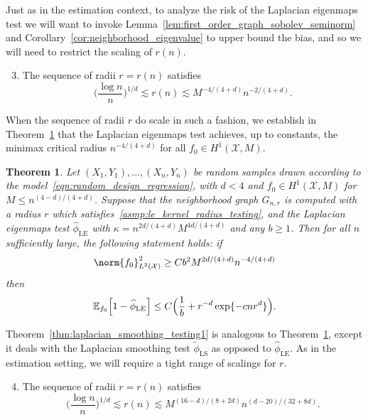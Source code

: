 \documentclass{article}
\newcommand{\1}{\mathbf{1}}
\newcommand{\Xset}{\mathcal{X}}
\newcommand{\Leb}{L}
\newcommand{\Ebb}{\mathbb{E}}
\newcommand{\wt}[1]{\widetilde{#1}}
\newcommand{\wh}[1]{\widehat{#1}}
\newcommand{\LE}{\mathrm{LE}}
\newcommand{\LS}{\mathrm{LS}}
\theoremstyle{alden}
\theoremstyle{aldenthm}
\newtheorem{theorem}{Theorem}
\theoremstyle{definition}
\theoremstyle{remark}
\begin{document}
Just as in the estimation context, to analyze the risk of the Laplacian eigenmaps test we will want to invoke Lemma~\ref{lem:first_order_graph_sobolev_seminorm} and Corollary~\ref{cor:neighborhood_eigenvalue} to upper bound the bias, and so we will need to restrict the scaling of $r(n)$.
\begin{enumerate}[label=(R\arabic*)]
	\setcounter{enumi}{2}
	\item 
	\label{asmp:le_kernel_radius_testing}
	The sequence of radii $r = r(n)$ satisfies
	\begin{equation*}
	\biggl(\frac{\log n}{n}\biggr)^{1/d} \lesssim r(n) \lesssim M^{-4/(4 + d)}n^{-2/(4 + d)}.
	\end{equation*}
\end{enumerate}
When the sequence of radii $r$ do scale in such a fashion, we establish in Theorem~\ref{thm:laplacian_eigenmaps_testing1} that the Laplacian eigenmaps test achieves, up to constants, the minimax critical radius $n^{-4/(4 + d)}$ for all $f_0 \in H^1(\Xset,M)$.
\begin{theorem}
	\label{thm:laplacian_eigenmaps_testing1}
	Let $(X_1,Y_1),\ldots,(X_n,Y_n)$ be random samples drawn according to the model~\eqref{eqn:random_design_regression}, with $d < 4$ and $f_0 \in H^1(\Xset,M)$ for $M \leq n^{(4 - d)/(4 + d)}$. Suppose that the neighborhood graph $G_{n,r}$ is computed with a radius $r$ which satisfies~\ref{asmp:le_kernel_radius_testing}, and the Laplacian eigenmaps test $\wh{\phi}_{\LE}$ with $\kappa = n^{2d/(4 + d)} M^{4d/(4 + d)}$ and any $b \geq 1$. Then for all $n$ sufficiently large, the following statement holds: if
	\begin{equation}
	\label{eqn:laplacian_eigenmaps_testing1}
	\norm{f_0}_{\Leb^2(\Xset)}^2 \geq C b^2 M^{2d/(4 + d)} n^{-4/(4 + d)}
	\end{equation}
	then
	\begin{equation*}
	\Ebb_{f_0}\Bigl[1 - \wh{\phi}_{\LE}\Bigr] \leq C \Bigl(\frac{1}{b} + r^{-d} \exp\{- c n r^d\}\Bigr).
	\end{equation*}
\end{theorem}

Theorem~\ref{thm:laplacian_smoothing_testing1} is analogous to Theorem~\ref{thm:laplacian_eigenmaps_testing1}, except it deals with the Laplacian smoothing test $\wt{\phi}_{\LS}$ as opposed to $\wh{\phi}_{\LE}$. As in the estimation setting, we will require a tight range of scalings for $r$.
\begin{enumerate}[label=(R\arabic*)]
	\setcounter{enumi}{3}
	\item 
	\label{asmp:ls_kernel_radius_testing}
	The sequence of radii $r = r(n)$ satisfies
	\begin{equation*}
	\biggl(\frac{\log n}{n}\biggr)^{1/d} \lesssim r(n) \lesssim M^{(16 - d)/(8 + 2d)}n^{(d - 20)/(32 + 8d)}.
	\end{equation*}
\end{enumerate}
\end{document}
